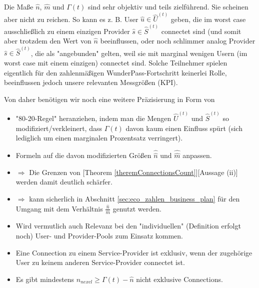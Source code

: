 \vspace{1cm}


\todo{[TODO3]["Verdichtung"]}
\vspace{0.3cm}

Die Maße $\widehat{n}$, $\widehat{m}$ und $\Gamma(t)$ sind sehr objektiv und teils zielführend. Sie scheinen aber nicht zu reichen. So kann es z. B. User $\widehat{u} \in \widehat{U}^{(t)}$ geben, die im worst case ausschließlich zu einem einzigen Provider $\widehat{s} \in \widehat{S}^{(t)}$ connectet sind (und somit aber trotzdem den Wert von $\widehat{n}$ beeinflussen, oder noch schlimmer analog Provider $\widehat{s} \in \widehat{S}^{(t)}$, die als "angebunden" gelten, weil sie mit marginal wenigen Usern (im worst case mit einem einzigen) connectet sind. Solche Teilnehmer spielen eigentlich für den zahlenmäßigen WunderPass-Fortschritt keinerlei Rolle, beeinflussen jedoch unsere relevanten Messgrößen (KPI).

Von daher benötigen wir noch eine weitere Präzisierung in Form von

\begin{itemize}
  \item "80-20-Regel" heranziehen, indem man die Mengen $\widehat{U}^{(t)}$ und $\widehat{S}^{(t)}$ so modifiziert/verkleinert, dass $\Gamma(t)$ davon kaum einen Einfluss spürt (sich lediglich um einen marginalen Prozentsatz verringert).
  \item Formeln auf die davon modifizierten Größen $\widehat{\widehat{n}}$ und $\widehat{\widehat{m}}$ anpassen.
  \item $\Rightarrow$ Die Grenzen von [Theorem \ref{theremConnectionsCount}][Aussage (ii)] werden damit deutlich schärfer.
  \item $\Rightarrow$ kann sicherlich in Abschnitt \ref{sec:eco_zahlen_business_plan} für den Umgang mit dem Verhältnis $\frac{\widehat{n}}{\widehat{m}}$ genutzt werden.
  \item Wird vermutlich auch Relevanz bei den "individuellen" (Definition erfolgt noch) User- und Provider-Pools zum Einsatz kommen.
\end{itemize}

\vspace{1cm}

\vspace{0.3cm}

\begin{itemize}
  \item Eine Connection zu einem Service-Provider ist exklusiv, wenn der zugehörige User zu keinem anderen Service-Provider connectet ist.
    \item Es gibt mindestens $n_{nexcl} \geq \Gamma(t) - \widehat{n}$ nicht exklusive Connections.
  
\end{itemize}

